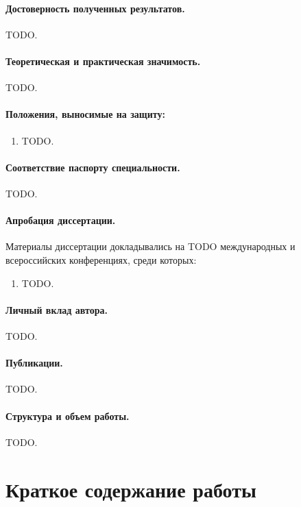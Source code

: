 \documentclass[a4paper,14pt]{extarticle}                     %
\theoremstyle{plain}                                         %
\begin{document}
\paragraph{Достоверность полученных результатов.} TODO.

\paragraph{Теоретическая и практическая значимость.} TODO.

\paragraph{Положения, выносимые на защиту:}
\begin{enumerate}
\item TODO.
\end{enumerate}

\paragraph{Соответствие паспорту специальности.} TODO.

\paragraph{Апробация диссертации.}
Материалы диссертации докладывались на TODO международных и всероссийских конференциях, среди которых:
\begin{enumerate}
\item TODO.
\end{enumerate}

\paragraph{Личный вклад автора.} TODO.

\paragraph{Публикации.} TODO.

\paragraph{Структура и объем работы.} TODO.


\newpage
\section*{Краткое содержание работы}
\end{document}
